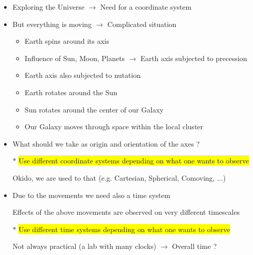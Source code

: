 \begin{itemize}
\item Exploring the Universe $\rightarrow$ {\blue Need for a coordinate system}
\item But {\blue everything is moving} $\rightarrow$ Complicated situation
\begin{itemize}
\item Earth spins around its axis
\item Influence of Sun, Moon, Planets $\rightarrow$ Earth axis subjected to precession
\item Earth axis also subjected to nutation
\item Earth rotates around the Sun
\item Sun rotates around the center of our Galaxy
\item Our Galaxy moves through space within the local cluster
\end{itemize}
\item What should we take as origin and orientation of the axes ?
\item[$\ast$] \colorbox{yellow}{Use different coordinate systems depending on what one wants to observe}
\item[] Okido, we are used to that (e.g. Cartesian, Spherical, Comoving, ...)
\item Due to the movements we {\blue need also a time system}
\item[] Effects of the above movements are observed on very different timescales
\item[$\ast$] \colorbox{yellow}{Use different time systems depending on what one wants to observe}
\item[] Not always practical (a lab with many clocks) $\rightarrow$ {\blue Overall time ?}
\end{itemize}
